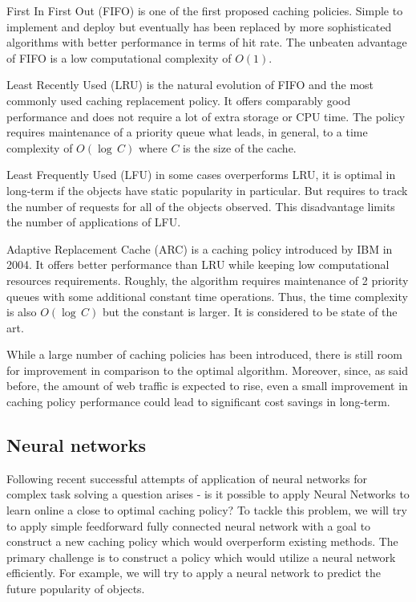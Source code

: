 First In First Out (FIFO) is one of the first proposed caching policies. Simple to implement and deploy but eventually has been replaced by more sophisticated algorithms with better performance in terms of hit rate. The unbeaten advantage of FIFO is a low computational complexity of $ O(1) $.

Least Recently Used (LRU) is the natural evolution of FIFO and the most commonly used caching replacement policy. It offers comparably good performance and does not require a lot of extra storage or CPU time. The policy requires maintenance of a priority queue what leads, in general, to a time complexity of $ O(\log\,C) $ where $C$ is the size of the cache.

Least Frequently Used (LFU) in some cases overperforms LRU, it is optimal in long-term if the objects have static popularity in particular. But requires to track the number of requests for all of the objects observed. This disadvantage limits the number of applications of LFU.

Adaptive Replacement Cache (ARC) \cite{3} is a caching policy introduced by IBM \cite{4} in 2004. It offers better performance than LRU while keeping low computational resources requirements. Roughly, the algorithm requires maintenance of 2 priority queues with some additional constant time operations. Thus, the time complexity is also $ O(\log\,C) $ but the constant is larger. It is considered to be state of the art.

While a large number of caching policies has been introduced, there is still room for improvement in comparison to the optimal algorithm. Moreover, since, as said before, the amount of web traffic is expected to rise, even a small improvement in caching policy performance could lead to significant cost savings in long-term.

\subsection{Neural networks} \label{neural_networks_intro}

Following recent successful attempts of application of neural networks \cite{6} for complex task solving \cite{7,8,9} a question arises - is it possible to apply Neural Networks to learn online a close to optimal caching policy? To tackle this problem, we will try to apply simple feedforward fully connected neural network with a goal to construct a new caching policy which would overperform existing methods. The primary challenge is to construct a policy which would utilize a neural network efficiently. For example, we will try to apply a neural network to predict the future popularity of objects.

